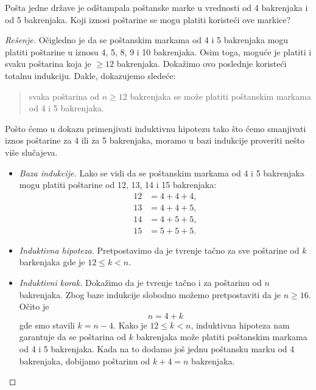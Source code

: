 \begin{EX}
  Po\v sta jedne dr\v zave je od\v stampala po\v stanske marke u vrednosti od 4 bakrenjaka i od 5 bakrenjaka.
  Koji iznosi po\v starine se mogu platiti koriste\'ci ove markice?
\end{EX}
\begin{proof}[Re\v senje]
  O\v cigledno je da se po\v stanskim markama od 4 i 5 bakrenjaka mogu platiti po\v starine u iznosu
  4, 5, 8, 9 i 10 bakrenjaka. Osim toga, mogu\'ce je platiti i svaku po\v starina koja je $\ge 12$ bakrenjaka.
  Doka\v zimo ovo poslednje koriste\'ci totalnu indukciju. Dakle, dokazujemo slede\'ce:
  \begin{quote}
    svaka po\v starina od $n \ge 12$ bakrenjaka se mo\v ze platiti po\v stanskim markama od 4 i 5 bakrenjaka.
  \end{quote}
  Po\v sto \'cemo u dokazu primenjivati induktivnu hipotezu tako \v sto \'cemo smanjivati iznos po\v starine za 4 ili za 5 bakrenjaka,
  moramo u bazi indukcije proveriti ne\v sto vi\v se slu\v cajeva.
  \begin{itemize}
  \item
    \emph{Baza indukcije.} Lako se vidi da se po\v stanskim markama od 4 i 5 bakrenjaka mogu platiti
    po\v starine od 12, 13, 14 i 15 bakrenjaka:
    \begin{align*}
      12 &= 4 + 4 + 4,\\
      13 &= 4 + 4 + 5,\\
      14 &= 4 + 5 + 5,\\
      15 &= 5 + 5 + 5.
    \end{align*}
  
  \item
    \emph{Induktivna hipoteza.} Pretpostavimo da je tvr\dj enje ta\v cno za sve po\v starine od $k$ barkenjaka gde je $12 \le k < n$.
  \item
    \emph{Induktivni korak.} Doka\v zimo da je tvr\dj enje ta\v cno i za po\v starinu od $n$ bakrenjaka.
    Zbog baze indukcije slobodno mo\v zemo pretpostaviti da je $n \ge 16$. O\v cito je
    $$
      n = 4 + k
    $$
    gde smo stavili $k = n - 4$. Kako je $12 \le k < n$, induktivna hipoteza nam garantuje da se po\v starina od $k$ bakrenjaka mo\v ze
    platiti po\v stanskim markama od 4 i 5 bakrenjaka. Kada na to dodamo jo\v s jednu po\v stansku marku od 4 bakrenjaka, dobijamo
    po\v starinu od $k + 4 = n$ bakrenjaka.\qedhere
  \end{itemize}
\end{proof}

